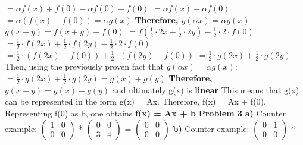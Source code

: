 \documentclass[12pt]{article}
\begin{document}
$= \alpha f(x) + f(0) - \alpha f(0) - f(0)$
\newline
$= \alpha f(x) - \alpha f(0)$
\newline
$= \alpha (f(x) - f(0)) = \alpha g(x)$
\newline
\newline
\textbf{Therefore, $g(\alpha x) = \alpha g(x)$} 
\newline
$g(x + y) = f(x + y) - f(0)$
$= f(\frac{1}{2} \cdot 2x + \frac{1}{2} \cdot 2y) - \frac{1}{2} \cdot 2 \cdot f(0)$
\newline
$= \frac{1}{2} \cdot f(2x) + \frac{1}{2} \cdot f(2y) - \frac{1}{2} \cdot 2 \cdot f(0)$
\newline
$= \frac{1}{2} \cdot (f(2x) - f(0)) + \frac{1}{2} \cdot (f(2y)- f(0)) $
\newline
$= \frac{1}{2} \cdot g(2x) + \frac{1}{2} \cdot g(2y) $
\newline
Then, using the previously proven fact that $g(\alpha x) = \alpha g(x)$:
\newline
$= \frac{1}{2} \cdot g(2x) + \frac{1}{2} \cdot g(2y) = g(x) + g(y) $
\newline
\textbf{Therefore, $g(x + y) = g(x) + g(y)$} and ultimately g(x) is \textbf{linear}
\newline
This means that g(x) can be represented in the form g(x) = Ax.
\newline
Therefore, f(x) = Ax + f(0).
\newline
Representing f(0) as b, one obtains \textbf{f(x) = Ax + b}
\newline
\newline
\textbf{Problem 3}
\newline
\textbf{a)}
\newline
Counter example:
\newline
$\left(\begin{array}{cc} 1 & 0  \\ 0 & 0  \end{array}\right)$  *
$\left(\begin{array}{cc} 0 & 0  \\ 3 & 4\end{array}\right)$ =
$\left(\begin{array}{cc} 0 & 0  \\ 0 & 0\end{array}\right)$
\newline
\textbf{b)}
\newline
Counter example:
\newline
$\left(\begin{array}{cc} 0 & 1  \\ 0 & 0  \end{array}\right)$  *
\end{document}
